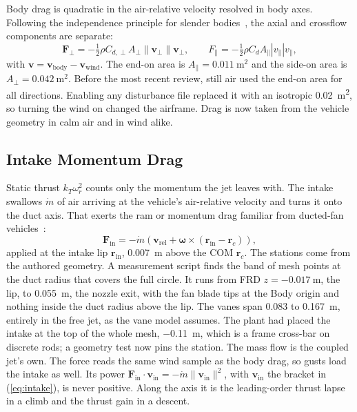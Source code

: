 \documentclass[journal]{IEEEtran}
\newcommand{\refeq}[1]{(\ref{#1})}
\newcommand{\vect}[1]{\bm{#1}}
\newcommand{\wb}{\vect{\omega}}
\newcommand{\mdot}{\dot{m}}
\newcommand{\wrot}{\omega_r}
\begin{document}
Body drag is quadratic in the air-relative velocity resolved in body axes.
Following the independence principle for slender bodies~\cite{hoerner1965}, the axial and crossflow components are separate:
\begin{equation}
\vect{F}_{\perp} = -\tfrac12\rho C_{d,\perp}A_{\perp}\|\vect{v}_{\perp}\|\vect{v}_{\perp}, \qquad
F_{\parallel} = -\tfrac12\rho C_d A_{\parallel}|v_{\parallel}|v_{\parallel},
\label{eq:bodydrag}
\end{equation}
with $\vect{v} = \vect{v}_{\text{body}} - \vect{v}_{\text{wind}}$.
The end-on area is $A_\parallel = \SI{0.011}{\metre\squared}$ and the side-on area is $A_\perp = \SI{0.042}{\metre\squared}$.
Before the most recent review, still air used the end-on area for all directions.
Enabling any disturbance file replaced it with an isotropic \SI{0.02}{\metre\squared}, so turning the wind on changed the airframe.
Drag is now taken from the vehicle geometry in calm air and in wind alike.

\subsection{Intake Momentum Drag}
\label{sec:intake}

Static thrust $k_T\wrot^2$ counts only the momentum the jet leaves with.
The intake swallows $\mdot$ of air arriving at the vehicle's air-relative velocity and turns it onto the duct axis.
That exerts the ram or momentum drag familiar from ducted-fan vehicles~\cite{johnson2006ducted,pflimlin2010ducted}:
\begin{equation}
\vect{F}_{\text{in}} = -\mdot\left(\vect{v}_{\text{rel}} + \wb\times(\vect{r}_{\text{in}} - \vect{r}_c)\right),
\label{eq:intake}
\end{equation}
applied at the intake lip $\vect{r}_{\text{in}}$, \SI{0.007}{\metre} above the COM $\vect{r}_c$.
The stations come from the authored geometry.
A measurement script finds the band of mesh points at the duct radius that covers the full circle.
It runs from FRD $z = \SI{-0.017}{\metre}$, the lip, to \SI{+0.055}{\metre}, the nozzle exit, with the fan blade tips at the Body origin and nothing inside the duct radius above the lip.
The vanes span \SI{+0.083}{} to \SI{+0.167}{\metre}, entirely in the free jet, as the vane model assumes.
The plant had placed the intake at the top of the whole mesh, \SI{-0.11}{\metre}, which is a frame cross-bar on discrete rods; a geometry test now pins the station.
The mass flow is the coupled jet's own.
The force reads the same wind sample as the body drag, so gusts load the intake as well.
Its power $\vect{F}_{\text{in}}\cdot\vect{v}_{\text{in}} = -\mdot\|\vect{v}_{\text{in}}\|^2$, with $\vect{v}_{\text{in}}$ the bracket in \refeq{eq:intake}, is never positive.
Along the axis it is the leading-order thrust lapse in a climb and the thrust gain in a descent.
\end{document}
